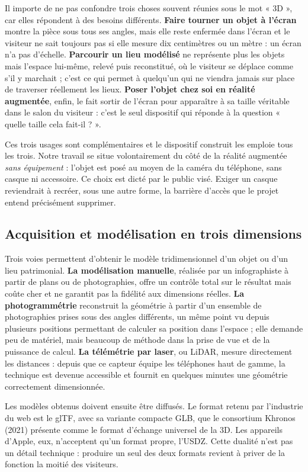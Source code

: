 Il importe de ne pas confondre trois choses souvent réunies sous le mot « 3D »,
car elles répondent à des besoins différents. \textbf{Faire tourner un objet à
l'écran} montre la pièce sous tous ses angles, mais elle reste enfermée dans
l'écran et le visiteur ne sait toujours pas si elle mesure dix centimètres ou un
mètre : un écran n'a pas d'échelle. \textbf{Parcourir un lieu modélisé} ne
représente plus les objets mais l'espace lui-même, relevé puis reconstitué, où
le visiteur se déplace comme s'il y marchait ; c'est ce qui permet à quelqu'un
qui ne viendra jamais sur place de traverser réellement les lieux.
\textbf{Poser l'objet chez soi en réalité augmentée}, enfin, le fait sortir de
l'écran pour apparaître à sa taille véritable dans le salon du visiteur : c'est
le seul dispositif qui réponde à la question « quelle taille cela fait-il ? ».

Ces trois usages sont complémentaires et le dispositif construit les emploie
tous les trois. Notre travail se situe volontairement du côté de la réalité
augmentée \emph{sans équipement} : l'objet est posé au moyen de la caméra du
téléphone, sans casque ni accessoire. Ce choix est dicté par le public visé.
Exiger un casque reviendrait à recréer, sous une autre forme, la barrière
d'accès que le projet entend précisément supprimer.

\subsection{Acquisition et modélisation en trois dimensions}

Trois voies permettent d'obtenir le modèle tridimensionnel d'un objet ou d'un
lieu patrimonial. \textbf{La modélisation manuelle}, réalisée par un
infographiste à partir de plans ou de photographies, offre un contrôle total sur
le résultat mais coûte cher et ne garantit pas la fidélité aux dimensions
réelles. \textbf{La photogrammétrie} reconstruit la géométrie à partir d'un
ensemble de photographies prises sous des angles différents, un même point vu
depuis plusieurs positions permettant de calculer sa position dans l'espace ;
elle demande peu de matériel, mais beaucoup de méthode dans la prise de vue et
de la puissance de calcul. \textbf{La télémétrie par laser}, ou LiDAR, mesure
directement les distances : depuis que ce capteur équipe les téléphones haut de
gamme, la technique est devenue accessible et fournit en quelques minutes une
géométrie correctement dimensionnée.

Les modèles obtenus doivent ensuite être diffusés. Le format retenu par
l'industrie du web est le glTF, avec sa variante compacte GLB, que le consortium
Khronos (2021) présente comme le format d'échange universel de la 3D. Les
appareils d'Apple, eux, n'acceptent qu'un format propre, l'USDZ. Cette dualité
n'est pas un détail technique : produire un seul des deux formats revient à
priver de la fonction la moitié des visiteurs.

